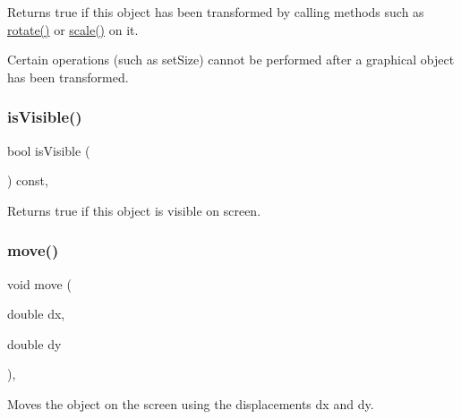 Returns {\ttfamily true} if this object has been transformed by calling methods such as \mbox{\hyperlink{classsgl_1_1GObject_ae1ffaa12185dfd5ba464f7d87c329e26}{rotate()}} or \mbox{\hyperlink{classsgl_1_1GObject_ad2e1900f730475c2d044817db03b38d6}{scale()}} on it. 

Certain operations (such as set\+Size) cannot be performed after a graphical object has been transformed. \mbox{\label{classsgl_1_1GObject_a9d8a6cfb13917785c143e74d40e4e2be}} 
\subsubsection{\texorpdfstring{is\+Visible()}{isVisible()}}
{\footnotesize\ttfamily bool is\+Visible (\begin{DoxyParamCaption}{ }\end{DoxyParamCaption}) const\hspace{0.3cm}{\ttfamily [virtual]}, {\ttfamily [inherited]}}



Returns {\ttfamily true} if this object is visible on screen. 

\mbox{\label{classsgl_1_1GObject_a5973d8dda83afb36e2c56855515be392}} 
\subsubsection{\texorpdfstring{move()}{move()}}
{\footnotesize\ttfamily void move (\begin{DoxyParamCaption}\item[{double}]{dx,  }\item[{double}]{dy }\end{DoxyParamCaption})\hspace{0.3cm}{\ttfamily [virtual]}, {\ttfamily [inherited]}}



Moves the object on the screen using the displacements {\ttfamily dx} and {\ttfamily dy}. 

\mbox{\label{classsgl_1_1GObject_ac827b978aa122f136a14c198687ad80f}} 
